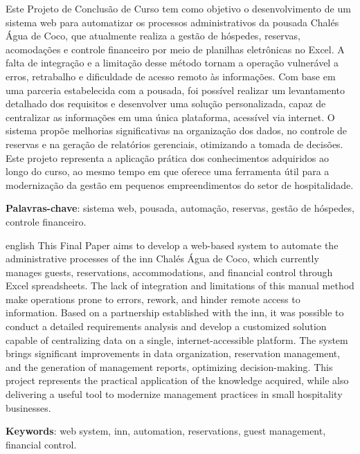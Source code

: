 \documentclass[
	12pt,				%
	openany,			%
	twoside,			%
	a4paper,			%
	english,			%
	french,				%
	spanish,			%
	brazil				%
	]{abntex2}
\begin{document}
\setlength{\absparsep}{18pt} %
\begin{resumo}
	Este Projeto de Conclusão de Curso tem como objetivo o desenvolvimento de um sistema web para automatizar os processos administrativos da pousada Chalés Água de Coco, que atualmente realiza a gestão de hóspedes, reservas, acomodações e controle financeiro por meio de planilhas eletrônicas no Excel. A falta de integração e a limitação desse método tornam a operação vulnerável a erros, retrabalho e dificuldade de acesso remoto às informações. Com base em uma parceria estabelecida com a pousada, foi possível realizar um levantamento detalhado dos requisitos e desenvolver uma solução personalizada, capaz de centralizar as informações em uma única plataforma, acessível via internet. O sistema propõe melhorias significativas na organização dos dados, no controle de reservas e na geração de relatórios gerenciais, otimizando a tomada de decisões. Este projeto representa a aplicação prática dos conhecimentos adquiridos ao longo do curso, ao mesmo tempo em que oferece uma ferramenta útil para a modernização da gestão em pequenos empreendimentos do setor de hospitalidade.
	
	\textbf{Palavras-chave}: sistema web, pousada, automação, reservas, gestão de hóspedes, controle financeiro.
\end{resumo}
\begin{resumo}[Abstract]
	\begin{otherlanguage*}{english}
		This Final Paper aims to develop a web-based system to automate the administrative processes of the inn Chalés Água de Coco, which currently manages guests, reservations, accommodations, and financial control through Excel spreadsheets. The lack of integration and limitations of this manual method make operations prone to errors, rework, and hinder remote access to information. Based on a partnership established with the inn, it was possible to conduct a detailed requirements analysis and develop a customized solution capable of centralizing data on a single, internet-accessible platform. The system brings significant improvements in data organization, reservation management, and the generation of management reports, optimizing decision-making. This project represents the practical application of the knowledge acquired, while also delivering a useful tool to modernize management practices in small hospitality businesses.
		
		\vspace{\onelineskip}
		
		\noindent 
		\textbf{Keywords}: web system, inn, automation, reservations, guest management, financial control.
	\end{otherlanguage*}
\end{resumo}
\end{document}
